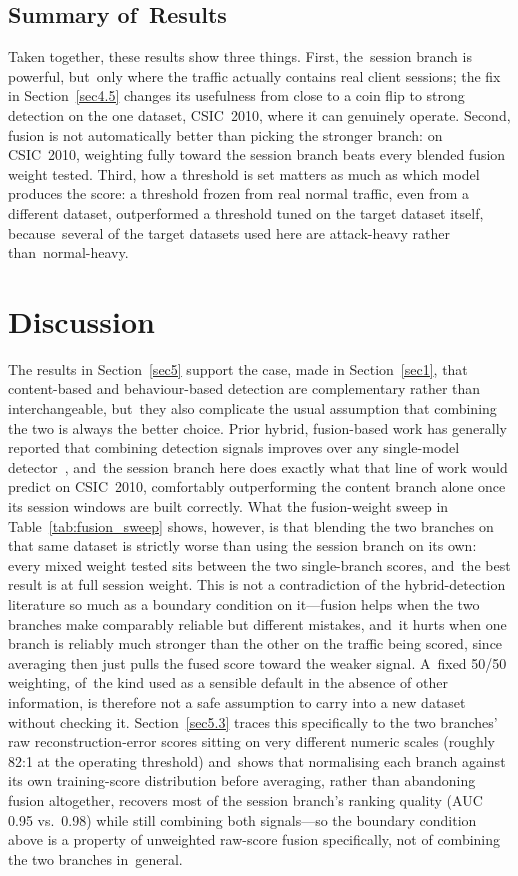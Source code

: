 \documentclass[futureinternet,article,accept,moreauthors]{Definitions/mdpi}
\begin{document}
\subsection{Summary of~Results}

Taken together, these results show three things. First, the~session branch is powerful, but~only where the traffic actually contains real client sessions; the fix in Section~\ref{sec4.5} changes its usefulness from close to a coin flip to strong detection on the one dataset, CSIC~2010, where it can genuinely operate. Second, fusion is not automatically better than picking the stronger branch: on CSIC~2010, weighting fully toward the session branch beats every blended fusion weight tested. Third, how a threshold is set matters as much as which model produces the score: a threshold frozen from real normal traffic, even from a different dataset, outperformed a threshold tuned on the target dataset itself, because~several of the target datasets used here are attack-heavy rather than~normal-heavy.

\section{Discussion} \label{sec6}

The results in Section~\ref{sec5} support the case, made in Section~\ref{sec1}, that content-based and behaviour-based detection are complementary rather than interchangeable, but~they also complicate the usual assumption that combining the two is always the better choice. Prior hybrid, fusion-based work has generally reported that combining detection signals improves over any single-model detector~\cite{kamal2025}, and~the session branch here does exactly what that line of work would predict on CSIC~2010, comfortably outperforming the content branch alone once its session windows are built correctly. What the fusion-weight sweep in Table~\ref{tab:fusion_sweep} shows, however, is that blending the two branches on that same dataset is strictly worse than using the session branch on its own: every mixed weight tested sits between the two single-branch scores, and~the best result is at full session weight. This is not a contradiction of the hybrid-detection literature so much as a boundary condition on it---fusion helps when the two branches make comparably reliable but different mistakes, and~it hurts when one branch is reliably much stronger than the other on the traffic being scored, since averaging then just pulls the fused score toward the weaker signal. A~fixed 50/50 weighting, of~the kind used as a sensible default in the absence of other information, is therefore not a safe assumption to carry into a new dataset without checking it. Section~\ref{sec5.3} traces this specifically to the two branches' raw reconstruction-error scores sitting on very different numeric scales (roughly 82:1 at the operating threshold) and~shows that normalising each branch against its own training-score distribution before averaging, rather than abandoning fusion altogether, recovers most of the session branch's ranking quality (AUC 0.95 vs.\ 0.98) while still combining both signals---so the boundary condition above is a property of unweighted raw-score fusion specifically, not of combining the two branches in~general.
\end{document}

